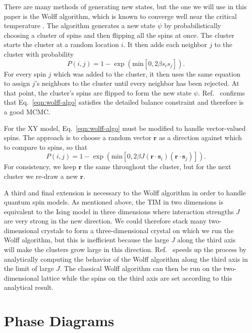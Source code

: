 \documentclass[amsmath,amssymb,aps,twocolumn,nofootinbib]{revtex4-2}
\newcommand{\parens}[1]{\left ( #1 \right )}
\begin{document}
There are many methods of generating new states, but the one we will use in this paper is the Wolff algorithm, which is known to converge well near the critical temperature \cite{wolff1989collective}. The algorithm generates a new state $\psi$ by probabilistically choosing a cluster of spins and then flipping all the spins at once. The cluster starts the cluster at a random location $i$. It then adds each neighbor $j$ to the cluster with probability
\begin{equation}
  P(i,j) = 1 - \exp\parens{\mathrm{min}\left[0, 2\beta s_i s_j \right]}.
  \label{eqn:wolff-algo}
\end{equation}
For every spin $j$ which was added to the cluster, it then uses the same equation to assign $j$'s neighbors to the cluster until every neighbor has been rejected. At that point, the cluster's spins are flipped to form the new state $\psi$. Ref.~\cite{wolff1989collective} confirms that Eq.~\ref{eqn:wolff-algo} satisfies the detailed balance constraint and therefore is a good MCMC.

For the XY model, Eq.~\ref{eqn:wolff-algo} must be modified to handle vector-valued spins. The approach is to choose a random vector $\bm r$ as a direction against which to compare to spins, so that
\begin{equation}
  P(i,j) = 1 - \exp\parens{\mathrm{min}\left[0, 2\beta J (\bm r \cdot \bm s_i)(\bm r \cdot \bm s_j) \right]}.
\end{equation}
For consistency, we keep $\bm r$ the same throughout the cluster, but for the next cluster we re-draw a new $\bm r$.

A third and final extension is necessary to the Wolff algorithm in order to handle quantum spin models. As mentioned above, the TIM in two dimensions is equivalent to the Ising model in three dimensions where interaction strengths $J$ are very strong in the new direction. We could therefore stack many two-dimensional crystals to form a three-dimensional crystal on which we run the Wolff algorithm, but this is inefficient because the large $J$ along the third axis will make the clusters grow large in this direction. Ref.~\cite{blote2002cluster} speeds up the process by analytically computing the behavior of the Wolff algorithm along the third axis in the limit of large $J$. The classical Wolff algorithm can then be run on the two-dimensional lattice while the spins on the third axis are set according to this analytical result.

\section{Phase Diagrams}
\label{sec:results}
\end{document}

